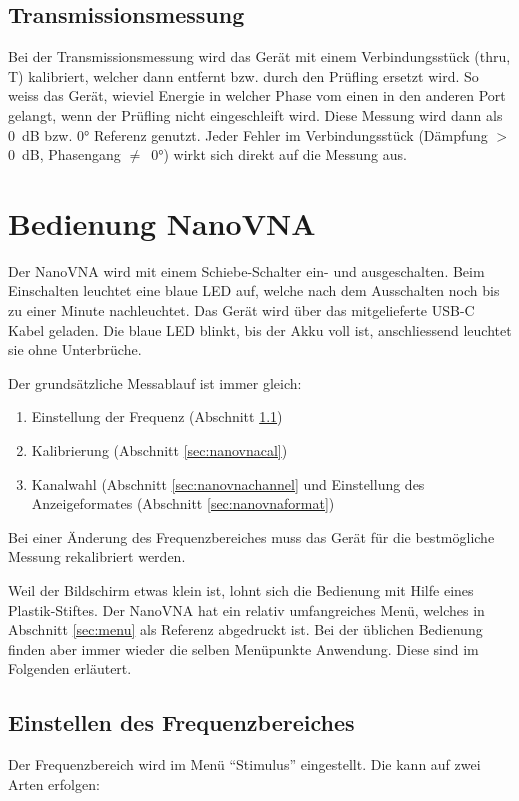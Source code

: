 \documentclass[twoside,a4paper,11pt,halfparskip,DIV=11,notitlepage]{scrartcl}
\begin{document}
\subsection{Transmissionsmessung}
Bei der Transmissionsmessung wird das Gerät mit einem Verbindungsstück (thru, T) kalibriert,
welcher dann entfernt bzw. durch den Prüfling ersetzt wird. So weiss das  Gerät,
wieviel Energie in welcher Phase vom einen in den anderen Port gelangt, wenn der
Prüfling nicht eingeschleift wird. Diese Messung wird dann als 0~dB bzw. 0° Referenz
genutzt. Jeder Fehler im Verbindungsstück (Dämpfung $>$ 0~dB, Phasengang $\ne$~0°)
wirkt sich direkt auf die Messung aus.


\section{Bedienung NanoVNA}
Der NanoVNA wird mit einem Schiebe-Schalter ein- und ausgeschalten. Beim Einschalten
leuchtet eine blaue LED auf, welche nach dem Ausschalten noch bis zu einer Minute
nachleuchtet. Das Gerät wird über das mitgelieferte USB-C Kabel geladen. Die blaue
LED blinkt, bis der Akku voll ist, anschliessend leuchtet sie ohne Unterbrüche.

Der grundsätzliche Messablauf ist immer gleich:

\begin{enumerate}
    \item Einstellung der Frequenz (Abschnitt \ref{sec:nanovnafreq})
    \item Kalibrierung (Abschnitt \ref{sec:nanovnacal}) %
    \item Kanalwahl (Abschnitt \ref{sec:nanovnachannel} und Einstellung des Anzeigeformates
        (Abschnitt \ref{sec:nanovnaformat})
\end{enumerate}

Bei einer Änderung des Frequenzbereiches muss das Gerät für die bestmögliche Messung
rekalibriert werden.

Weil der Bildschirm etwas klein ist, lohnt sich die Bedienung mit Hilfe eines
Plastik-Stiftes. Der NanoVNA hat ein relativ umfangreiches Menü, welches in
Abschnitt \ref{sec:menu} als Referenz abgedruckt ist. Bei der üblichen Bedienung
finden aber immer wieder die selben Menüpunkte Anwendung.  Diese sind im
Folgenden erläutert.

\subsection{Einstellen des Frequenzbereiches}\label{sec:nanovnafreq}
Der Frequenzbereich wird im Menü ``Stimulus'' eingestellt. Die kann auf zwei
Arten erfolgen:
\end{document}
